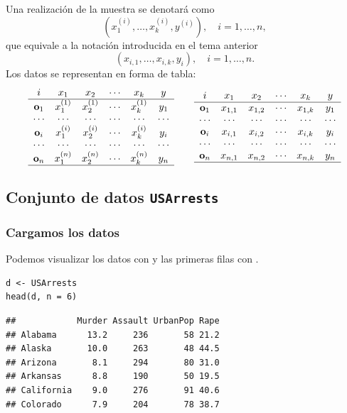Una realización de la muestra se denotará como \[ \left(x_1^{(i)},\dots,x_k^{(i)},y^{(i)}\right),\quad i=1,\dots,n, \] que equivale a la notación introducida en el tema anterior \[ (x_{i,1},\dots,x_{i,k},y_i),\quad i=1,\dots,n. \]
Los datos se representan en forma de tabla:
\[ \begin{array}{cccccc}
i & x_1 & x_2 & \cdots & x_k & y \\ \hline
\mathbf{o}_1 & x_1^{(1)} & x_2^{(1)} & \cdots & x_k^{(1)} & y_1 \\
\cdots & \cdots & \cdots & \cdots & \cdots & \cdots \\
\mathbf{o}_i & x_1^{(i)} & x_2^{(i)} & \cdots & x_k^{(i)} & y_i \\
\cdots & \cdots & \cdots & \cdots & \cdots & \cdots \\
\mathbf{o}_n & x_1^{(n)} & x_2^{(n)} & \cdots & x_k^{(n)} & y_n \\ \hline
\end{array}\qquad\begin{array}{cccccc}
i & x_1 & x_2 & \cdots & x_k & y \\ \hline
\mathbf{o}_1 & x_{1,1} & x_{1,2} & \cdots & x_{1,k} & y_1 \\
\cdots & \cdots & \cdots & \cdots & \cdots & \cdots \\
\mathbf{o}_i & x_{i,1} & x_{i,2} & \cdots & x_{i,k} & y_i \\
\cdots & \cdots & \cdots & \cdots & \cdots & \cdots \\
\mathbf{o}_n & x_{n,1} & x_{n,2} & \cdots & x_{n,k} & y_n \\ \hline
\end{array} \]

\subsection{Conjunto de datos \textbf{\texttt{USArrests}}}

\subsubsection*{Cargamos los datos}
Podemos visualizar los datos con  y las primeras filas con .

\begin{lstlisting}
d <- USArrests
head(d, n = 6)
\end{lstlisting}

\begin{verbatim}
##            Murder Assault UrbanPop Rape
## Alabama      13.2     236       58 21.2
## Alaska       10.0     263       48 44.5
## Arizona       8.1     294       80 31.0
## Arkansas      8.8     190       50 19.5
## California    9.0     276       91 40.6
## Colorado      7.9     204       78 38.7
\end{verbatim}
